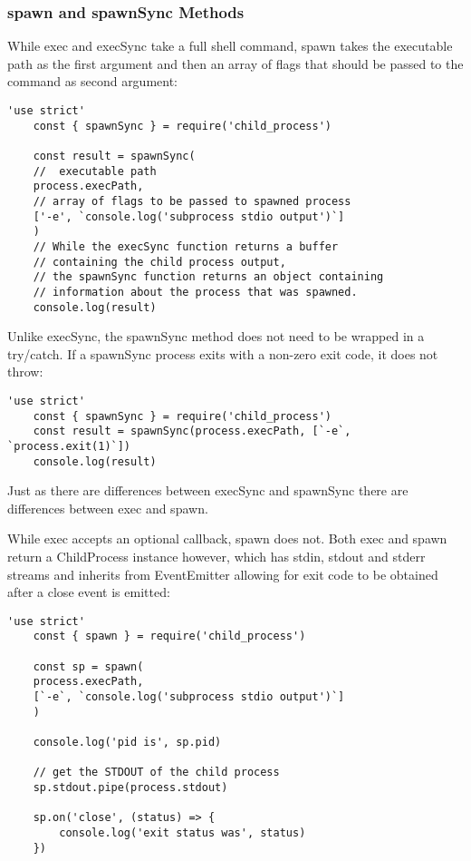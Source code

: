 \documentclass{scrartcl}
\begin{document}
\subsubsection{spawn and spawnSync Methods}

While exec and execSync take a full shell command, spawn takes the executable path as the first argument and then an array of flags that should be passed to the command as second argument:

\begin{lstlisting}[style=ES6]
    'use strict'
    const { spawnSync } = require('child_process')

    const result = spawnSync(
    //  executable path
    process.execPath,
    // array of flags to be passed to spawned process
    ['-e', `console.log('subprocess stdio output')`]
    )
    // While the execSync function returns a buffer
    // containing the child process output,
    // the spawnSync function returns an object containing
    // information about the process that was spawned.
    console.log(result)
\end{lstlisting}

Unlike execSync, the spawnSync method does not need to be wrapped in a try/catch. If a spawnSync process exits with a non-zero exit code, it does not throw:

\begin{lstlisting}[style=ES6]
    'use strict'
    const { spawnSync } = require('child_process')
    const result = spawnSync(process.execPath, [`-e`, `process.exit(1)`])
    console.log(result)
\end{lstlisting}

Just as there are differences between execSync and spawnSync there are differences between exec and spawn.

While exec accepts an optional callback, spawn does not. Both exec and spawn return a ChildProcess instance however, which has stdin, stdout and stderr streams and inherits from EventEmitter allowing for exit code to be obtained after a close event is emitted:

\begin{lstlisting}[style=ES6]
    'use strict'
    const { spawn } = require('child_process')

    const sp = spawn(
    process.execPath,
    [`-e`, `console.log('subprocess stdio output')`]
    )

    console.log('pid is', sp.pid)

    // get the STDOUT of the child process
    sp.stdout.pipe(process.stdout)

    sp.on('close', (status) => {
        console.log('exit status was', status)
    })
\end{lstlisting}
\end{document}
